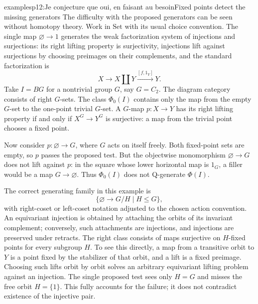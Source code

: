 \begin{dcomment}{examples}{p12:Je conjecture que oui, en faisant au besoin}{Fixed points detect the missing generators}
The difficulty with the proposed generators can be seen without homotopy theory. Work in $\mathrm{Set}$ with its usual choice convention. The single map $\varnothing\to 1$ generates the weak factorization system of injections and surjections: its right lifting property is surjectivity, injections lift against surjections by choosing preimages on their complements, and the standard factorization is
\[
 X\longrightarrow X\amalg Y\xrightarrow{[f,1_Y]}Y.
\]
Take $I=BG$ for a nontrivial group $G$, say $G=C_2$. The diagram category consists of right $G$-sets. The class $\Phi_0(I)$ contains only the map from the empty $G$-set to the one-point trivial $G$-set. A $G$-map $p:X\to Y$ has its right lifting property if and only if $X^G\to Y^G$ is surjective: a map from the trivial point chooses a fixed point.

Now consider $p:\varnothing\to G$, where $G$ acts on itself freely. Both fixed-point sets are empty, so $p$ passes the proposed test. But the objectwise monomorphism $\varnothing\to G$ does not lift against $p$: in the square whose lower horizontal map is $1_G$, a filler would be a map $G\to\varnothing$. Thus $\Phi_0(I)$ does not Q-generate $\Phi(I)$.

The correct generating family in this example is
\[
 \{\varnothing\to G/H\mid H\leq G\},
\]
with right-coset or left-coset notation adjusted to the chosen action convention. An equivariant injection is obtained by attaching the orbits of its invariant complement; conversely, such attachments are injections, and injections are preserved under retracts. The right class consists of maps surjective on $H$-fixed points for every subgroup $H$. To see this directly, a map from a transitive orbit to $Y$ is a point fixed by the stabilizer of that orbit, and a lift is a fixed preimage. Choosing such lifts orbit by orbit solves an arbitrary equivariant lifting problem against an injection. The single proposed test sees only $H=G$ and misses the free orbit $H=\{1\}$. This fully accounts for the failure; it does not contradict existence of the injective pair.
\end{dcomment}

